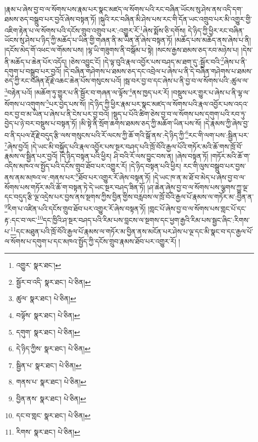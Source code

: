 །རྣམ་པ་ཞེས་བྱ་བ་ལ་སོགས་པས་རྣམ་པར་སྣང་མཛད་ལ་སོགས་པའི་རང་བཞིན་ཡོངས་སུ་ཤེས་ནས་འདི་དག་ཐམས་ཅད་བསྒྲུབ་པར་བྱའོ་ཞེས་བསྟན་ཏོ། །སྐུའི་རང་བཞིན་མི་ཤེས་པས་རང་གི་དོན་ཡང་འགྲུབ་པར་མི་འགྱུར་གྱི་འཇིག་རྟེན་པ་ལ་སོགས་པའི་དངོས་གྲུབ་འགྲུབ་པར་:འགྱུར་རོ་\footnote{འགྱུར་  སྣར་ཐང་། }ཞེས་སྨོས་ཅི་དགོས། དེ་ཉིད་ཀྱི་ཕྱིར་རང་བཞིན་ཡོངས་སུ་ཤེས་པ་ཉིད་ཀྱི་མཆོད་པ་ཡིན་གྱི་གཞན་ནི་མ་ཡིན་ནོ་ཞེས་བསྟན་ཏོ། །མཆོད་པས་མཆོད་ནས་ཞེས་པ་ནི། །དངོས་མེད་གོ་འཕང་ལ་གོམས་པས། །ལྷ་ཡི་གཟུགས་ནི་བསྒོམ་པ་སྟེ། །སངས་རྒྱས་ཐམས་ཅད་རབ་མཉེས་པ། །དེས་ནི་མཆོད་པ་ཆེན་པོར་འདོད། །ཅེས་འབྱུང་ངོ། །དེ་ལྟ་བུའི་རྣལ་འབྱོར་པས་བཤད་མ་ཐག་དུ་:སྦྱོར་བའི་\footnote{སྦྱོར་བ་འདི་  སྣར་ཐང་།  པེ་ཅིན། }ཞེས་པ་ནི་དགུག་པ་བསྒྲུབ་པར་བྱའོ། །དེ་བཞིན་གཤེགས་པ་ཐམས་ཅད་དང་འབྲེལ་པ་ཞེས་པ་ནི་དེ་བཞིན་གཤེགས་པ་ཐམས་ཅད་ཀྱི་རང་བཞིན་རྡོ་རྗེ་འཆང་ཆེན་པོས་གསུངས་པའོ། །སྦ་བར་བྱ་བ་དང་ཞེས་པ་ནི་བྱ་བ་ལ་སོགས་པའི་:ཚུལ་ལ་\footnote{ཚུལ་  སྣར་ཐང་།  པེ་ཅིན། }བརྟེན་པའོ། །མཆོག་ཏུ་གྱུར་པ་ནི་སྦྱོར་བ་གཞན་ལ་ལྟོས་\footnote{བལྟོས་  སྣར་ཐང་།  པེ་ཅིན། }ནས་ཁྱད་པར་རོ། །བསྡུས་པར་གྱུར་པ་ཞེས་པ་ནི་ལྷ་ལ་སོགས་པ་འགུགས་\footnote{དགུག་  སྣར་ཐང་།  པེ་ཅིན། }པར་བྱེད་པས་སོ། །དེ་ཉིད་ཀྱི་ཕྱིར་རྣམ་པར་སྣང་མཛད་ལ་སོགས་པའི་རྣལ་འབྱོར་པས་འདའ་བར་བྱ་བ་མ་ཡིན་པ་ཞེས་པ་ནི་ངེས་པར་བྱ་བའོ། །སྡུད་པ་པོའི་ཚིག་ཅེས་བྱ་བ་ལ་སོགས་པས་དགུག་པའི་རབ་ཏུ་བྱེད་པ་ཉེ་བར་བསྡུས་པ་བསྟན་ཏོ། །མི་སྟེ་ནི་སྲོག་ཆགས་ཐམས་ཅད་ཀྱི་མཆོག་ཡིན་པས་སོ། །དེ་རྣམས་ཀྱི་ཞེས་བྱ་བ་ནི་དཔལ་རྡོ་རྗེ་བདུད་རྩི་ལས་གསུངས་པའི་རོ་ལངས་ཀྱི་ཆོ་གའི་སྒོ་ནས་:དེ་ཉིད་ཀྱི་\footnote{དེ་ཉིད་ཀྱིས་  སྣར་ཐང་།  པེ་ཅིན། }རང་གི་ལག་པས་:སྦྱིན་པར་\footnote{སྦྱིན་པ་  སྣར་ཐང་།  པེ་ཅིན། }ཞེས་བྱའོ། །དེ་ཡང་མི་བསྐྱོད་པའི་རྣལ་འབྱོར་པས་སྔར་བཤད་པའི་ཁྲོ་བོའི་རྒྱལ་པོའི་གཏོར་མའི་ཆོ་གས་ཁྲོ་བོ་རྣམས་ལ་སྦྱིན་པར་བྱའོ། །དེ་ཉིད་བསྟན་པའི་ཕྱིར། ཤི་བའི་རོ་ལས་བྱུང་བས་ན། །ཞེས་བསྟན་ཏོ། །གཏོར་མའི་ཆོ་ག་འདིས་མཁའ་ལ་སྤྱོད་པའི་དངོས་གྲུབ་ཐོབ་པར་འགྱུར་རོ། །དེ་ཉིད་བསྟན་པའི་ཕྱིར། རང་གི་ལུས་བསྒྲུབ་པར་བྱས་ནས་ནམ་མཁའ་ལ་:གནས་པར་\footnote{གནས་པ་  སྣར་ཐང་།  པེ་ཅིན། }ཐོབ་པར་འགྱུར་རོ་ཞེས་བསྟན་ཏོ། །དེ་ཡང་ཁ་ན་མ་ཐོ་བ་མེད་པ་ཞེས་བྱ་བ་ལ་སོགས་པས་གཏོར་མའི་ཆོ་ག་བསྟན་ཏེ་དེ་ཡང་སྔར་བཤད་ཟིན་ཏོ། །ཤ་ཆེན་ཞེས་བྱ་བ་ལ་སོགས་པས་ལྕགས་ཀྱུ་ལྔ་དང་བདུད་རྩི་ལྔ་འདྲེས་པར་བྱས་ནས་སྔགས་ཀྱིས་བྱིན་གྱིས་བརླབས་ལ་ཁྲོ་བོའི་རྒྱལ་པོ་རྣམས་ལ་གཏོར་མ་:བྱིན་ན་\footnote{བྱིན་ནས་  སྣར་ཐང་།  པེ་ཅིན། }རིག་པ་འཛིན་པའི་དངོས་གྲུབ་ཐོབ་པར་འགྱུར་རོ་ཞེས་བསྟན་ཏོ། །གླང་པོ་ཞེས་བྱ་བ་ལ་སོགས་པས་གླང་པོ་དང་རྟ་:དང་བ་ལང་\footnote{དང་བ་གླང་  སྣར་ཐང་།  པེ་ཅིན། }དང་ཁྱིའི་ཤ་སྔར་བཤད་པའི་རིམ་པས་བླངས་ལ་སྔགས་དང་ཕྱག་རྒྱའི་རིམ་པས་སྦྱང་ཞིང་:རིགས་པ་\footnote{རིགས་  སྣར་ཐང་།  པེ་ཅིན། }དང་མཐུན་པའི་ཁྲོ་བོའི་རྒྱལ་པོ་རྣམས་ལ་གཏོར་མ་བྱིན་ནས་མངོན་པར་ཤེས་པ་ལྔ་དང་མི་སྣང་བ་དང་རྒྱལ་པོ་ལ་སོགས་པ་དགུག་པ་དང་མཁའ་སྤྱོད་ཀྱི་དངོས་གྲུབ་རྣམས་ཐོབ་པར་འགྱུར་རོ། །
